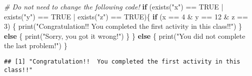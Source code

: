 \documentclass[
]{article}
\newenvironment{Shaded}{\begin{snugshade}}{\end{snugshade}}
\newcommand{\CommentTok}[1]{\textcolor[rgb]{0.56,0.35,0.01}{\textit{#1}}}
\newcommand{\ConstantTok}[1]{\textcolor[rgb]{0.00,0.00,0.00}{#1}}
\newcommand{\ControlFlowTok}[1]{\textcolor[rgb]{0.13,0.29,0.53}{\textbf{#1}}}
\newcommand{\DecValTok}[1]{\textcolor[rgb]{0.00,0.00,0.81}{#1}}
\newcommand{\FunctionTok}[1]{\textcolor[rgb]{0.00,0.00,0.00}{#1}}
\newcommand{\NormalTok}[1]{#1}
\newcommand{\SpecialCharTok}[1]{\textcolor[rgb]{0.00,0.00,0.00}{#1}}
\newcommand{\StringTok}[1]{\textcolor[rgb]{0.31,0.60,0.02}{#1}}
\begin{document}
\begin{Shaded}
\begin{Highlighting}[]
\CommentTok{\# Do not need to change the following code!}
\ControlFlowTok{if}\NormalTok{ (}\FunctionTok{exists}\NormalTok{(}\StringTok{"x"}\NormalTok{) }\SpecialCharTok{==} \ConstantTok{TRUE} \SpecialCharTok{|} \FunctionTok{exists}\NormalTok{(}\StringTok{"y"}\NormalTok{) }\SpecialCharTok{==} \ConstantTok{TRUE} \SpecialCharTok{|} \FunctionTok{exists}\NormalTok{(}\StringTok{"z"}\NormalTok{) }\SpecialCharTok{==} \ConstantTok{TRUE}\NormalTok{)\{}
  \ControlFlowTok{if}\NormalTok{ (x }\SpecialCharTok{==} \DecValTok{4} \SpecialCharTok{\&}\NormalTok{ y }\SpecialCharTok{==} \DecValTok{12} \SpecialCharTok{\&}\NormalTok{ z }\SpecialCharTok{==} \DecValTok{3}\NormalTok{) \{}
    \FunctionTok{print}\NormalTok{(}\StringTok{"Congratulation!!  You completed the first activity in this class!!"}\NormalTok{)}
\NormalTok{  \} }\ControlFlowTok{else}\NormalTok{ \{}
    \FunctionTok{print}\NormalTok{(}\StringTok{"Sorry, you got it wrong!"}\NormalTok{)}
\NormalTok{  \}}
\NormalTok{\} }\ControlFlowTok{else}\NormalTok{ \{}
  \FunctionTok{print}\NormalTok{(}\StringTok{"You did not complete the last problem!"}\NormalTok{)}
\NormalTok{\}}
\end{Highlighting}
\end{Shaded}

\begin{verbatim}
## [1] "Congratulation!!  You completed the first activity in this class!!"
\end{verbatim}
\end{document}
